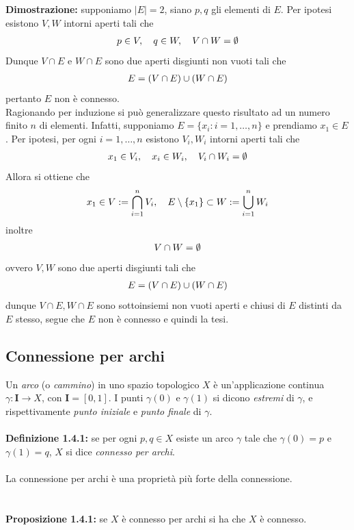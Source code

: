 \documentclass{article}
\begin{document}
\textbf{Dimostrazione:} supponiamo $|E| = 2$, siano $p, q$ gli elementi di $E$. Per ipotesi esistono $V, W$ intorni aperti tali che
\begin{gather}
    p \in V, \quad q \in W, \quad V \cap W = \emptyset \notag
\end{gather}
Dunque $V \cap E$ e $W \cap E$ sono due aperti disgiunti non vuoti tali che
\begin{gather}
    E = (V \cap E) \cup (W \cap E) \notag
\end{gather}
pertanto $E$ non è connesso. \\
Ragionando per induzione si può generalizzare questo risultato ad un numero finito $n$ di elementi. Infatti, supponiamo $E = \{ x_i : i = 1, \dots, n \}$ e prendiamo $x_1 \in E$. Per ipotesi, per ogni $i = 1, \dots, n$ esistono $V_i, W_i$ intorni aperti tali che
\begin{gather}
    x_1 \in V_i, \quad x_i \in W_i, \quad V_i \cap W_i = \emptyset \notag
\end{gather}
Allora si ottiene che
\begin{gather}
    x_1 \in V := \bigcap_{i = 1}^n V_i, \quad E \setminus \{ x_1 \} \subset W := \bigcup_{i = 1}^n W_i \notag
\end{gather}
inoltre
\begin{gather}
    V \cap W = \emptyset \notag
\end{gather}
ovvero $V, W$ sono due aperti disgiunti tali che
\begin{gather}
    E = (V \cap E) \cup (W \cap E) \notag
\end{gather}
dunque $V \cap E, W \cap E$ sono sottoinsiemi non vuoti aperti e chiusi di $E$ distinti da $E$ stesso, segue che $E$ non è connesso e quindi la tesi.

\newpage
\subsection{Connessione per archi}
Un \textit{arco} (o \textit{cammino}) in uno spazio topologico $X$ è un'applicazione continua $\gamma : \mathbf{I} \longrightarrow X$, con $\mathbf{I} = [0, 1]$. I punti $\gamma(0)$ e $\gamma(1)$ si dicono \textit{estremi} di $\gamma$, e rispettivamente \textit{punto iniziale} e \textit{punto finale} di $\gamma$. \\ \\
\textbf{Definizione 1.4.1:} se per ogni $p, q \in X$ esiste un arco $\gamma$ tale che $\gamma(0) = p$ e $\gamma(1) = q$, $X$ si dice \textit{connesso per archi}. \\ \\
La connessione per archi è una proprietà più forte della connessione. \\ \\ \\
\textbf{Proposizione 1.4.1:} se $X$ è connesso per archi si ha che $X$ è connesso. \\
\end{document}
